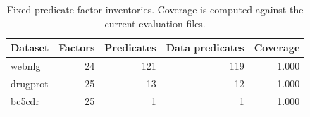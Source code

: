 \begin{table}[t]
\centering
\caption{Fixed predicate-factor inventories. Coverage is computed against the current evaluation files.}
\label{tab:factor-inventory}
\scriptsize
\begin{tabular}{lrrrr}
\toprule
Dataset & Factors & Predicates & Data predicates & Coverage \\
\midrule
webnlg & 24 & 121 & 119 & 1.000 \\
drugprot & 25 & 13 & 12 & 1.000 \\
bc5cdr & 25 & 1 & 1 & 1.000 \\
\bottomrule
\end{tabular}
\end{table}
